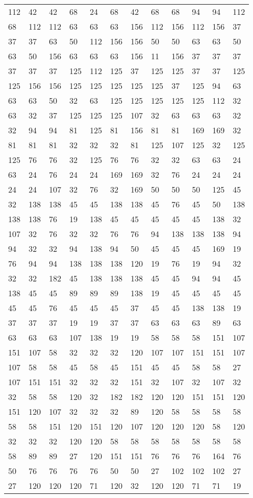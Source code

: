 \begin{longtable}{llllllllllll}
112 &42& 42 &68 &24& 68&42 &68& 68 &94 &94& 112\\
68 &112& 112 &63 &63& 63&156 &112& 156 &112 &156& 37\\
37 &37& 63 &50 &112& 156&156 &50& 50 &63 &63& 50\\
63 &50& 156 &63 &63& 63&156 &11& 156 &37 &37& 37\\
37 &37& 37 &125 &112& 125&37 &125& 125 &37 &37& 125\\
125 &156& 156 &125 &125& 125&125 &125& 37 &125 &94& 63\\
63 &63& 50 &32 &63& 125&125 &125& 125 &125 &112& 32\\
63 &32& 37 &125 &125& 125&107 &32& 63 &63 &63& 32\\
32 &94& 94 &81 &125& 81&156 &81& 81 &169 &169& 32\\
81 &81& 81 &32 &32& 32&81 &125& 107 &125 &32& 125\\
125 &76& 76 &32 &125& 76&76 &32& 32 &63 &63& 24\\
63 &24& 76 &24 &24& 169&169 &32& 76 &24 &24& 24\\
24 &24& 107 &32 &76& 32&169 &50& 50 &50 &125& 45\\
32 &138& 138 &45 &45& 138&138 &45& 76 &45 &50& 138\\
138 &138& 76 &19 &138& 45&45 &45& 45 &45 &138& 32\\
107 &32& 76 &32 &32& 76&76 &94& 138 &138 &138& 94\\
94 &32& 32 &94 &138& 94&50 &45& 45 &45 &169& 19\\
76 &94& 94 &138 &138& 138&120 &19& 76 &19 &94& 32\\
32 &32& 182 &45 &138& 138&138 &45& 45 &94 &94& 45\\
138 &45& 45 &89 &89& 89&138 &19& 45 &45 &45& 45\\
45 &45& 76 &45 &45& 45&37 &45& 45 &138 &138& 19\\
37 &37& 37 &19 &19& 37&37 &63& 63 &63 &89& 63\\
63 &63& 63 &107 &138& 19&19 &58& 58 &58 &151& 107\\
151 &107& 58 &32 &32& 32&120 &107& 107 &151 &151& 107\\
107 &58& 58 &45 &58& 45&151 &45& 45 &58 &58& 27\\
107 &151& 151 &32 &32& 32&151 &32& 107 &32 &107& 32\\
32 &58& 58 &120 &32& 182&182 &120& 120 &151 &151& 120\\
151 &120& 107 &32 &32& 32&89 &120& 58 &58 &58& 58\\
58 &58& 151 &120 &151& 120&107 &120& 120 &120 &58& 120\\
32 &32& 32 &120 &120& 58&58 &58& 58 &58 &58& 58\\
58 &89& 89 &27 &120& 151&151 &76& 76 &76 &164& 76\\
50 &76& 76 &76 &76& 50&50 &27& 102 &102 &102& 27\\
27 &120& 120 &120 &71& 120&32 &120& 120 &71 &71& 19\\
\bottomrule\end{longtable}

